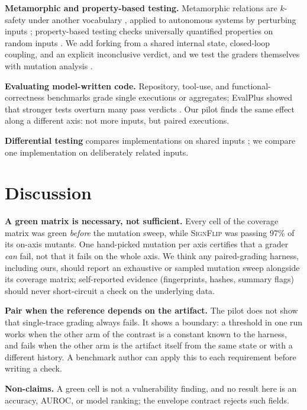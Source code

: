 \documentclass[sigconf,review,anonymous]{acmart}
\begin{document}
	\textbf{Metamorphic and property-based testing.} Metamorphic relations
	are $k$-safety under another vocabulary \cite{chen1998,segura2016},
	applied to autonomous systems by perturbing inputs \cite{tian2018};
	property-based testing checks universally quantified properties on
	random inputs \cite{claessen2000}. We add forking from a shared internal
	state, closed-loop coupling, and an explicit inconclusive verdict, and we
	test the graders themselves with mutation analysis \cite{jia2011}.
	
	\textbf{Evaluating model-written code.} Repository, tool-use, and
	functional-correctness benchmarks
	\cite{jimenez2024,yao2024,liu2023,zhou2024,chen2021} grade single
	executions or aggregates; EvalPlus showed that stronger tests overturn
	many pass verdicts \cite{liu2023evalplus}. Our pilot finds the same
	effect along a different axis: not more inputs, but paired executions.
	
	\textbf{Differential testing} compares implementations on shared inputs
	\cite{mckeeman1998}; we compare one implementation on deliberately
	related inputs.
	
	\section{Discussion}
	\label{sec:discussion}
	
	\textbf{A green matrix is necessary, not sufficient.} Every cell of
	the coverage matrix was green \emph{before} the mutation sweep, while
	\textsc{SignFlip} was passing 97\% of its on-axis mutants. One hand-picked
	mutation per axis certifies that a grader \emph{can} fail, not that it
	fails on the whole axis. We think any paired-grading harness, including
	ours, should report an exhaustive or sampled mutation sweep alongside its
	coverage matrix; self-reported evidence (fingerprints, hashes, summary
	flags) should never short-circuit a check on the underlying data.
	
	\textbf{Pair when the reference depends on the artifact.} The pilot does
	not show that single-trace grading always fails. It shows a boundary: a
	threshold in one run works when the other arm of the contrast is a
	constant known to the harness, and fails when the other arm is the
	artifact itself from the same state or with a different history. A
	benchmark author can apply this to each requirement before writing a
	check.
	
	\textbf{Non-claims.} A green cell is not a vulnerability finding, and no
	result here is an accuracy, AUROC, or model ranking; the envelope
	contract rejects such fields.
	
\end{document}
